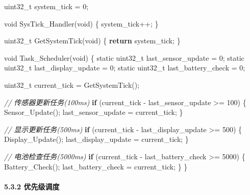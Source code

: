 \documentclass[
]{article}
\newenvironment{Shaded}{}{}
\newcommand{\CommentTok}[1]{\textcolor[rgb]{0.38,0.63,0.69}{\textit{#1}}}
\newcommand{\ControlFlowTok}[1]{\textcolor[rgb]{0.00,0.44,0.13}{\textbf{#1}}}
\newcommand{\DataTypeTok}[1]{\textcolor[rgb]{0.56,0.13,0.00}{#1}}
\newcommand{\DecValTok}[1]{\textcolor[rgb]{0.25,0.63,0.44}{#1}}
\newcommand{\NormalTok}[1]{#1}
\begin{document}
\begin{Shaded}
\begin{Highlighting}[]
\DataTypeTok{uint32\_t}\NormalTok{ system\_tick = }\DecValTok{0}\NormalTok{;}

\DataTypeTok{void}\NormalTok{ SysTick\_Handler(}\DataTypeTok{void}\NormalTok{)}
\NormalTok{\{}
\NormalTok{    system\_tick++;}
\NormalTok{\}}

\DataTypeTok{uint32\_t}\NormalTok{ GetSystemTick(}\DataTypeTok{void}\NormalTok{)}
\NormalTok{\{}
    \ControlFlowTok{return}\NormalTok{ system\_tick;}
\NormalTok{\}}

\DataTypeTok{void}\NormalTok{ Task\_Scheduler(}\DataTypeTok{void}\NormalTok{)}
\NormalTok{\{}
    \DataTypeTok{static} \DataTypeTok{uint32\_t}\NormalTok{ last\_sensor\_update = }\DecValTok{0}\NormalTok{;}
    \DataTypeTok{static} \DataTypeTok{uint32\_t}\NormalTok{ last\_display\_update = }\DecValTok{0}\NormalTok{;}
    \DataTypeTok{static} \DataTypeTok{uint32\_t}\NormalTok{ last\_battery\_check = }\DecValTok{0}\NormalTok{;}
    
    \DataTypeTok{uint32\_t}\NormalTok{ current\_tick = GetSystemTick();}
    
    \CommentTok{// 传感器更新任务(100ms)}
    \ControlFlowTok{if}\NormalTok{ (current\_tick {-} last\_sensor\_update \textgreater{}= }\DecValTok{100}\NormalTok{) \{}
\NormalTok{        Sensor\_Update();}
\NormalTok{        last\_sensor\_update = current\_tick;}
\NormalTok{    \}}
    
    \CommentTok{// 显示更新任务(500ms)}
    \ControlFlowTok{if}\NormalTok{ (current\_tick {-} last\_display\_update \textgreater{}= }\DecValTok{500}\NormalTok{) \{}
\NormalTok{        Display\_Update();}
\NormalTok{        last\_display\_update = current\_tick;}
\NormalTok{    \}}
    
    \CommentTok{// 电池检查任务(5000ms)}
    \ControlFlowTok{if}\NormalTok{ (current\_tick {-} last\_battery\_check \textgreater{}= }\DecValTok{5000}\NormalTok{) \{}
\NormalTok{        Battery\_Check();}
\NormalTok{        last\_battery\_check = current\_tick;}
\NormalTok{    \}}
\NormalTok{\}}
\end{Highlighting}
\end{Shaded}

\hypertarget{ux4f18ux5148ux7ea7ux8c03ux5ea6}{%
\paragraph{5.3.2 优先级调度}\label{ux4f18ux5148ux7ea7ux8c03ux5ea6}}
\end{document}
